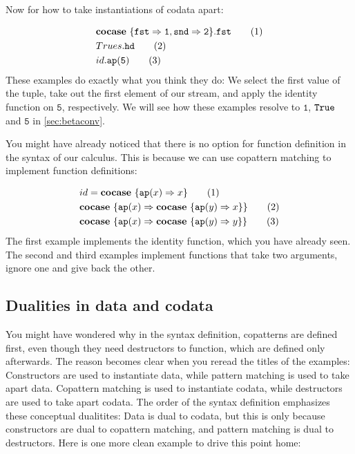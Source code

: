 \documentclass[twoside,12pt,a4paper]{article}
\begin{document}
Now for how to take instantiations of codata apart:

\begin{example}
    \begin{align*}
        &\textbf{cocase}\ \{\mathtt{fst\Rightarrow 1, snd\Rightarrow 2}\}.\mathtt{fst}\tag{1}\\
        &Trues.\mathtt{hd}\tag{2}\\
        &id.\texttt{ap}(\mathtt{5})\tag{3}
    \end{align*}
    These examples do exactly what you think they do: We select the first value of the tuple, 
    take out the first element of our stream, and apply the identity function on $\mathtt{5}$, respectively.
    We will see how these examples resolve to $\mathtt{1}$, $\mathtt{True}$ and $\mathtt{5}$ in \cref{sec:betaconv}.
\end{example} 

You might have already noticed that there is no option for function definition in the syntax of our calculus.
This is because we can use copattern matching to implement function definitions:
\begin{example}
    \begin{align*}
        &id = \textbf{cocase}\ \{\texttt{ap}(x)\Rightarrow x\}\tag{1}\\
        &\textbf{cocase}\ \{\texttt{ap}(x)\Rightarrow \textbf{cocase}\ \{\texttt{ap}(y)\Rightarrow x\}\} \tag{2} \\
        &\textbf{cocase}\ \{\texttt{ap}(x)\Rightarrow \textbf{cocase}\ \{\texttt{ap}(y)\Rightarrow y\}\} \tag{3}
    \end{align*}
    The first example implements the identity function, which you have already seen. 
    The second and third examples implement functions that take two arguments, ignore one and give back the other.
\end{example}

\subsection{Dualities in data and codata}
You might have wondered why in the syntax definition, copatterns are defined first, even though they need destructors to function, which are defined only afterwards.
The reason becomes clear when you reread the titles of the examples:
Constructors are used to instantiate data, while pattern matching is used to take apart data.
Copattern matching is used to instantiate codata, while destructors are used to take apart codata.
The order of the syntax definition emphasizes these conceptual dualitites:
Data is dual to codata, but this is only because constructors are dual to copattern matching, 
and pattern matching is dual to destructors.
Here is one more clean example to drive this point home:  
\end{document}
